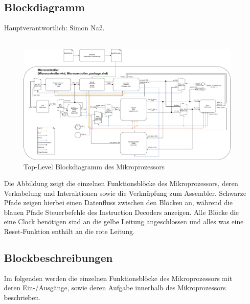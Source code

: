 \documentclass[bibliography=totoc,listof=totoc,index=totoc]{scrartcl}
\begin{document}
\subsection{Blockdiagramm}
Hauptverantwortlich: Simon Naß.\\\\
\begin{figure}[H]
    \centering
    \includegraphics[width=\textwidth]{BlockdiagramMitVHDL.pdf}
    \caption{Top-Level Blockdiagramm des Mikroprozessors}
    \label{fig:toplevel_blockdiagramm}
\end{figure}
Die Abbildung zeigt die einzelnen Funktionsblöcke des Mikroprozessors, deren Verkabelung und Interaktionen sowie die Verknüpfung zum Assembler. Schwarze Pfade zeigen hierbei einen Datenfluss zwischen den Blöcken an, während die blauen Pfade Steuerbefehle des Instruction Decoders anzeigen. Alle Blöcke die eine Clock benötigen sind an die gelbe Leitung angeschlossen und alles was eine Reset-Funktion enthält an die rote Leitung.

\subsection{Blockbeschreibungen}
Im folgenden werden die einzelnen Funktionsblöcke des Mikroprozessors mit deren Ein-/Ausgänge, sowie deren Aufgabe innerhalb des Mikroprozessors beschrieben.
\end{document}
